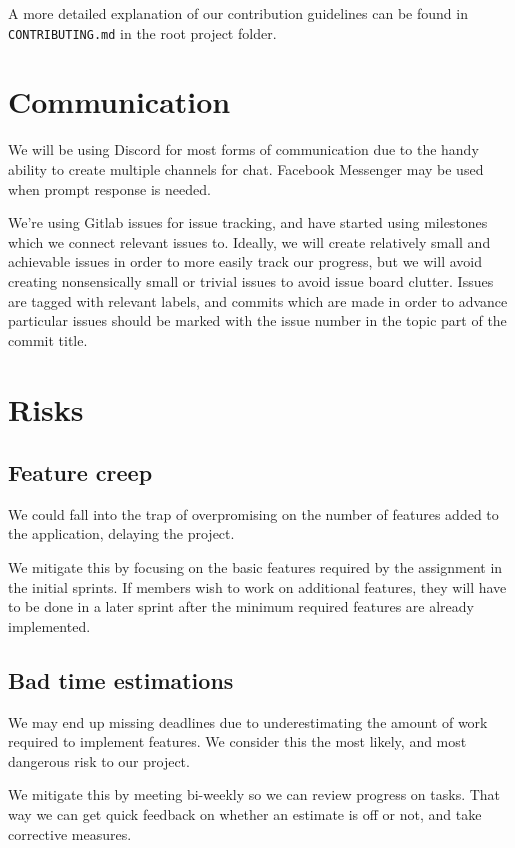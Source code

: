 \documentclass{article}
\begin{document}
A more detailed explanation of our contribution guidelines can be found in \texttt{CONTRIBUTING.md} in the root project folder.

\section*{Communication}

We will be using Discord for most forms of communication due to the handy ability to create multiple channels for chat. Facebook Messenger may be used when prompt response is needed.

We're using Gitlab issues for issue tracking, and have started using milestones which we connect relevant issues to. Ideally, we will create relatively small and achievable issues in order to more easily track our progress, but we will avoid creating nonsensically small or trivial issues to avoid issue board clutter. Issues are tagged with relevant labels, and commits which are made in order to advance particular issues should be marked with the issue number in the topic part of the commit title.

\section*{Risks}

\subsection*{Feature creep}

We could fall into the trap of overpromising on the number of features added to the application, delaying the project.

We mitigate this by focusing on the basic features required by the assignment in the initial sprints. If members wish to work on additional features, they will have to be done in a later sprint after the minimum required features are already implemented.

\subsection*{Bad time estimations}

We may end up missing deadlines due to underestimating the amount of work required to implement features. We consider this the most likely, and most dangerous risk to our project.

We mitigate this by meeting bi-weekly so we can review progress on tasks. That way we can get quick feedback on whether an estimate is off or not, and take corrective measures.
\end{document}
